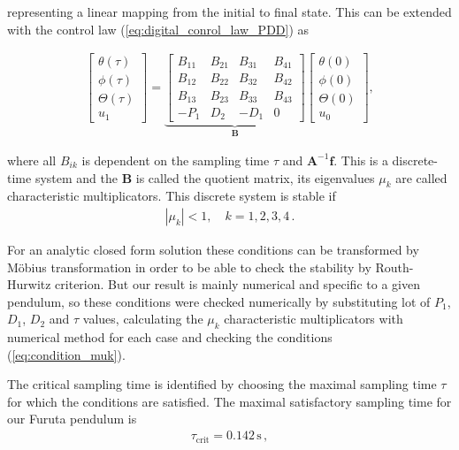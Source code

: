 \noindent representing a linear mapping from the initial to final state. This can be extended with the control law (\ref{eq:digital_conrol_law_PDD}) as

\begin{align}
		\begin{bmatrix}
			\theta(\tau)		\\
			\phi(\tau)		\\
			\Theta(\tau)	\\
			u_1
		\end{bmatrix}
		= 
		\underbrace{\begin{bmatrix}
				B_{ 1 1 } & B_{ 2 1 } & B_{ 3 1 } & B_{ 4 1 }\\
				B_{ 1 2 } & B_{ 2 2 } & B_{ 3 2 } & B_{ 4 2 }\\
				B_{ 1 3 } & B_{ 2 3 } & B_{ 3 3 } & B_{ 4 3 }\\
				-P_1	  & D_2       & -D_1      & 0
		\end{bmatrix}}_{\displaystyle \mathbf B}
		\begin{bmatrix}
				\theta(0)		\\
				\phi(0)		\\
				\Theta(0) \\
				u_0
		\end{bmatrix},
\end{align}

\noindent where all $B_{ik}$ is dependent on the sampling time $\tau$ and $\mathbf A^{-1} \mathbf f$.
This is a discrete-time system and the $\mathbf B$ is called the quotient matrix, its eigenvalues $\mu_k$ are called characteristic multiplicators. This discrete system is stable if 
\begin{align}
	|\mu_k| < 1,\quad k=1,2,3,4\,.
	\label{eq:condition_muk}
\end{align}

For an analytic closed form solution these  conditions can be transformed by Möbius transformation in order to be able to check the stability by Routh-Hurwitz criterion.
%
But our result is mainly numerical and specific to a given pendulum, so these conditions were checked numerically by substituting lot of $P_1$, $D_1$, $D_2$ and $\tau$ values, calculating the $\mu_k$ characteristic multiplicators with numerical method for each case and checking the conditions (\ref{eq:condition_muk}). 

The critical sampling time is identified by choosing the maximal sampling time $\tau$ for which the conditions are satisfied.
The maximal satisfactory sampling time for our Furuta pendulum is
\begin{align}
	\tau_\mathrm{crit} = 0.142 \,\mathrm s\,, 
\end{align}

